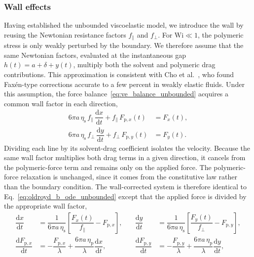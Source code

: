 \documentclass{elsarticle}
\newcommand{\wi}{\mathrm{Wi}}
\begin{document}
\subsubsection{Wall effects}
\label{sec:ve_wall}

Having established the unbounded viscoelastic model, we introduce the
wall by reusing the Newtonian resistance factors
$f_{\parallel}$ and $f_{\perp}$. For $\wi\ll1$, the polymeric stress is
only weakly perturbed by the boundary. We therefore assume that the same
Newtonian factors, evaluated at the instantaneous gap
$h(t)=a+\delta+y(t)$, multiply both the solvent and polymeric drag
contributions. This approximation is consistent with Cho
et al.~\cite{cho1980study}, who found Fax\'en-type corrections accurate
to a few percent in weakly elastic fluids. Under this assumption, the
force balance~\eqref{eq:ve_balance_unbounded} acquires a common wall
factor in each direction,
\begin{equation}
\label{eq:ve_force_balance}
\begin{aligned}
6\pi a\,\eta_{\mathrm{s}}\,f_{\parallel}\,\dfrac{\mathrm{d}x}{\mathrm{d}t}
+ f_{\parallel}\,F_{\mathrm{p},x}(t) &= F_x(t),\\[0.3em]
6\pi a\,\eta_{\mathrm{s}}\,f_{\perp}\,\dfrac{\mathrm{d}y}{\mathrm{d}t}
+ f_{\perp}\,F_{\mathrm{p},y}(t) &= F_y(t).
\end{aligned}
\end{equation}
Dividing each line by its solvent-drag coefficient isolates the velocity.
Because the same wall factor multiplies both drag terms in a given
direction, it cancels from the polymeric-force term and remains only on
the applied force. The polymeric-force relaxation is unchanged, since it
comes from the constitutive law rather than the boundary condition. The
wall-corrected system is therefore identical to
Eq.~\eqref{eq:oldroyd_b_ode_unbounded} except that the applied force is
divided by the appropriate wall factor,
\begin{equation}
\label{eq:oldroyd_b_force_ode}
\begin{aligned}
\dfrac{\mathrm{d}x}{\mathrm{d}t}
&= \dfrac{1}{6\pi a\,\eta_{\mathrm{s}}}
\left[\dfrac{F_x(t)}{f_{\parallel}} - F_{\mathrm{p},x}\right],
&\quad
\dfrac{\mathrm{d}y}{\mathrm{d}t}
&= \dfrac{1}{6\pi a\,\eta_{\mathrm{s}}}
\left[\dfrac{F_y(t)}{f_{\perp}} - F_{\mathrm{p},y}\right],
\\[0.5em]
\dfrac{\mathrm{d}F_{\mathrm{p},x}}{\mathrm{d}t}
&= -\dfrac{F_{\mathrm{p},x}}{\lambda}
+ \dfrac{6\pi a\,\eta_{\mathrm{p}}}{\lambda}\dfrac{\mathrm{d}x}{\mathrm{d}t},
&\quad
\dfrac{\mathrm{d}F_{\mathrm{p},y}}{\mathrm{d}t}
&= -\dfrac{F_{\mathrm{p},y}}{\lambda}
+ \dfrac{6\pi a\,\eta_{\mathrm{p}}}{\lambda}\dfrac{\mathrm{d}y}{\mathrm{d}t},
\end{aligned}
\end{equation}
\end{document}
